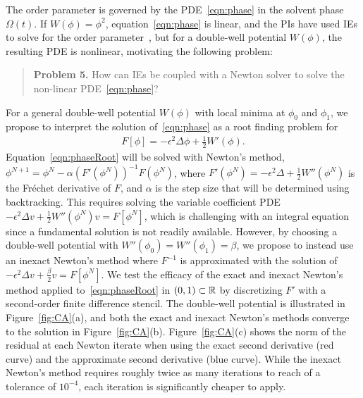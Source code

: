 The order parameter is governed by the PDE~\eqref{eqn:phase} in the
solvent phase $\Omega(t)$. If $W(\phi) = \phi^2$,
equation~\eqref{eqn:phase} is linear, and the PIs have used IEs to solve
for the order parameter~\cite{Fu2018_SIAM, FuQuRyYo22,
fu-ryh-qua-you2022}, but for a double-well potential $W(\phi)$, the
resulting PDE is nonlinear, motivating the following problem:

\begin{quotation}
  \noindent
  \textbf{Problem 5.} How can IEs be coupled with a Newton solver to
  solve the non-linear PDE~\eqref{eqn:phase}?
\end{quotation}

For a general double-well potential $W(\phi)$ with local minima at
$\phi_0$ and $\phi_1$, we propose to interpret the solution
of~\eqref{eqn:phase} as a root finding problem for
\begin{align}
  \label{eqn:phaseRoot}
  F[\phi] = -\epsilon^2 \Delta \phi + \tfrac{1}{2}W'(\phi).
\end{align}
Equation~\eqref{eqn:phaseRoot} will be solved with Newton's method,
$\phi^{N+1} = \phi^{N} - \alpha (F'(\phi^N))^{-1} F(\phi^N)$, where
$F'(\phi^N) = -\epsilon^2 \Delta + \tfrac{1}{2}W''(\phi^N)$ is the
Fr\'{e}chet derivative of $F$, and $\alpha$ is the step size that will
be determined using backtracking. This requires solving the variable
coefficient PDE $-\epsilon^2 \Delta v + \tfrac{1}{2}W''(\phi^{N}) v =
F[\phi^N]$, which is challenging with an integral equation since a
fundamental solution is not readily available. However, by choosing a
double-well potential with $W''(\phi_0) = W''(\phi_1) = \beta$, we
propose to instead use an inexact Newton's method where $F^{-1}$ is
approximated with the solution of $-\epsilon^2 \Delta v +
\tfrac{\beta}{2} v = F[\phi^N]$. We test the efficacy of the exact and
inexact Newton's method applied to~\eqref{eqn:phaseRoot} in $(0,1)
\subset \mathbb{R}$ by discretizing $F'$ with a second-order finite difference
stencil. The double-well potential is illustrated in
Figure~\ref{fig:CA}(a), and both the exact and inexact Newton's methods
converge to the solution in Figure~\ref{fig:CA}(b).
Figure~\ref{fig:CA}(c) shows the norm of the residual at each Newton
iterate when using the exact second derivative (red curve) and the
approximate second derivative (blue curve). While the inexact Newton's
method requires roughly twice as many iterations to reach of a tolerance
of $10^{-4}$, each iteration is significantly cheaper to apply.

